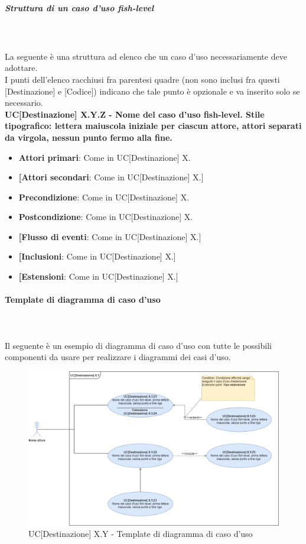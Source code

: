 \subparagraph*{Struttura di un caso d'uso fish-level}\mbox{}\\ \\
La seguente è una struttura ad elenco che un caso d'uso  necessariamente deve adottare.\\
I punti dell'elenco racchiusi fra parentesi quadre (non sono inclusi fra questi [Destinazione] e [Codice]) indicano che tale punto è opzionale e va inserito solo se necessario.\\
\textbf{UC[Destinazione] X.Y.Z - Nome del caso d'uso fish-level. Stile tipografico: lettera maiuscola iniziale per ciascun attore, attori separati da virgola, nessun punto fermo alla fine.}%
\begin{itemize}
	\item \textbf{Attori primari}: Come in UC[Destinazione] X.
	\item \textbf{[Attori secondari}: Come in UC[Destinazione] X.]
	\item \textbf{Precondizione}: Come in UC[Destinazione] X.
	\item \textbf{Postcondizione}: Come in UC[Destinazione] X.
	\item \textbf{[Flusso di eventi}: Come in UC[Destinazione] X.]
	\item \textbf{[Inclusioni}: Come in UC[Destinazione] X.]
	\item \textbf{[Estensioni}: Come in UC[Destinazione] X.]
\end{itemize}

\paragraph{Template di diagramma di caso d'uso}\mbox{}\\ \\
Il seguente è un esempio di diagramma di caso d'uso con tutte le possibili componenti  da usare per realizzare i diagrammi dei casi d'uso.
\begin{figure}[h]
	\centering	
	\includegraphics[scale=0.45]{images/TemplateSchemaUseCase.png}
	\caption{UC[Destinazione] X.Y - Template di diagramma di caso d'uso}
\end{figure}

